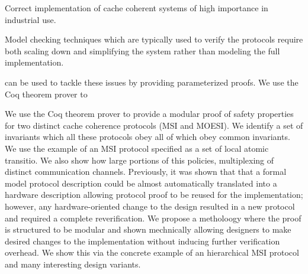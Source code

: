 
Correct implementation of cache coherent systems of high importance in
industrial use. 



Model checking techniques which are typically used to verify
the protocols require both scaling down and simplifying the system rather than
modeling the full implementation.

 can be used to tackle these
issues by providing parameterized proofs. 
We use the Coq theorem prover to 

We use the Coq theorem
prover to provide a modular proof of safety properties for two distinct cache coherence
protocols (MSI and MOESI). We identify a set of invariants which all these protocols obey  all of which obey common invariants. We use the example of an MSI protocol specified as a set of local atomic transitio. We also show how large portions of this
policies, multiplexing of distinct communication channels. Previously,
it was shown that that a formal model protocol description could be
almost automatically translated into a hardware description allowing
protocol proof to be reused for the implementation; however, any
hardware-oriented change to the design resulted in a new protocol and
required a complete reverification. We propose a metholoogy where the
proof is structured to be modular and shown mechnically allowing
designers to make desired changes to the implementation without
inducing further verification overhead. We show this via the concrete
example of an hierarchical MSI protocol and many interesting design variants.


